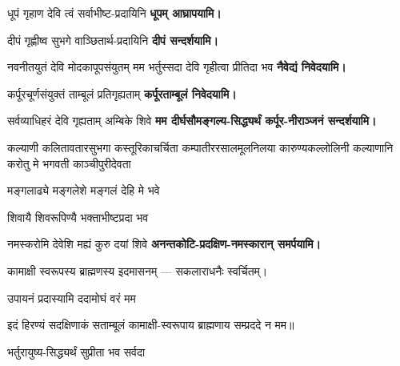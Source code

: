\begin{center}

{धूपं गृहाण देवि त्वं सर्वाभीष्ट-प्रदायिनि}
\textbf{\devAya{} धूपम् आघ्रापयामि।}
\medskip

{दीपं गृह्णीष्व सुभगे वाञ्छितार्थ-प्रदायिनि}
\textbf{\devAya{} दीपं सन्दर्शयामि।}
\medskip

{नवनीतयुतं देवि मोदकापूपसंयुतम्}
{मम भर्तुस्सदा देवि गृहीत्वा प्रीतिदा भव}
\textbf{\devAya{} नैवेद्यं निवेदयामि।}
\medskip

{कर्पूरचूर्णसंयुक्तं ताम्बूलं प्रतिगृह्यताम्}
\textbf{\devAya{} कर्पूरताम्बूलं निवेदयामि।}
\medskip

{सर्वव्याधिहरं देवि गृह्यताम् अम्बिके शिवे}
\textbf{\devAya{} मम दीर्घसौमङ्गल्य-सिद्ध्यर्थं कर्पूर-नीराञ्जनं सन्दर्शयामि।}
\medskip

{कल्याणी कलितावतारसुभगा कस्तूरिकाचर्चिता}
{कम्पातीररसालमूलनिलया कारुण्यकल्लोलिनी}
{कल्याणानि करोतु मे भगवती काञ्चीपुरीदेवता}

{मङ्गलाढ्ये मङ्गलेशे मङ्गलं देहि मे भवे}

{शिवायै शिवरूपिण्यै भक्ताभीष्टप्रदा भव}

{नमस्करोमि देवेशि मह्यं कुरु दयां शिवे}
\textbf{\devAya{} अनन्तकोटि-प्रदक्षिण-नमस्कारान् समर्पयामि।}
\medskip

कामाक्षी स्वरूपस्य ब्राह्मणस्य इदमासनम् — सकलाराधनैः स्वर्चितम्।

{उपायनं प्रदास्यामि ददामोघं वरं मम}

इदं हिरण्यं सदक्षिणाकं सताम्बूलं कामाक्षी-स्वरूपाय ब्राह्मणाय सम्प्रददे न मम॥

\bigskip


{भर्तुरायुष्य-सिद्ध्यर्थं सुप्रीता भव सर्वदा}

\end{center}

